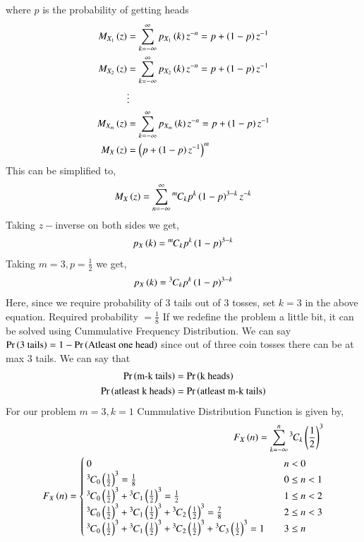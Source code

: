 \documentclass[journal]{IEEEtran}
\begin{document}
where $p$ is the probability of getting heads
\begin{align}
  M_{X_1}\left(z\right)&=\sum_{k=-\infty}^{\infty}p_{X_1}\left(k\right)z^{-n} = p + \left(1-p\right)z^{-1}\\
  M_{X_2}\left(z\right)&=\sum_{k=-\infty}^{\infty}p_{X_2}\left(k\right)z^{-n} = p + \left(1-p\right)z^{-1}\\
  &\vdots\\
  M_{X_m}\left(z\right)&=\sum_{k=-\infty}^{\infty}p_{X_m}\left(k\right)z^{-n} = p + \left(1-p\right)z^{-1}\\   M_X\left(z\right) &= \left(p + \left(1-p\right)z^{-1}\right)^{m}
\end{align}
This can be simplified to,
\begin{align}
  M_X\left(z\right) = \sum_{n=-\infty}^{\infty} {{}^{m}\mkern-1muC_{k}}p^{k}\left(1-p\right)^{3-k}z^{-k}
\end{align}
Taking $z-$inverse on both sides we get,
\begin{align}
  p_X\left(k\right) = {{}^{m}\mkern-1muC_{k}} p^{k} \left(1-p\right)^{3-k} 
\end{align}
Taking $m=3, p = \frac{1}{2}$ we get,
\begin{align}
  p_X\left(k\right) = {{}^{3}\mkern-1muC_{k}}p^k\left(1-p\right)^{3-k}
\end{align}
Here, since we require probability of $3$ tails out of $3$ tosses, set $k=3$ in the above equation.\newline
Required probability $=\frac{1}{8}$\newline
If we redefine the problem a little bit, it can be solved using Cummulative Frequency Distribution. We can say $\Pr\left(\text{3 tails}\right) = 1 - \Pr\left(\text{Atleast one head}\right)$ since out of three coin tosses there can be at max $3$ tails.\newline
We can say that 
\begin{align}
  \Pr\left(\text{m-k tails}\right) &= \Pr\left(\text{k heads}\right)\\
  \Pr\left(\text{atleast k heads}\right) &= \Pr\left(\text{atleast m-k tails}\right)
\end{align}
For our problem $m=3, k=1$
Cummulative Distribution Function is given by,
\begin{align}
    F_X \left(n\right) = \sum _{k=-\infty}^{n} {{}^{3}\mkern-1muC_{k}} \left(\frac{1}{2}\right)^3\\ 
    F_{X}\left(n\right) = \begin{cases}
        0 & \quad n < 0\\
        {{}^{3}\mkern-1muC_{0}}\left(\frac{1}{2}\right)^3 = \frac{1}{8} & \quad 0 \leq n < 1\\
        {{}^{3}\mkern-1muC_{0}}\left(\frac{1}{2}\right)^3 + {{}^{3}\mkern-1muC_{1}}\left(\frac{1}{2}\right)^3 = \frac{1}{2} & \quad 1 \leq n < 2\\
        {{}^{3}\mkern-1muC_{0}}\left(\frac{1}{2}\right)^3 + {{}^{3}\mkern-1muC_{1}}\left(\frac{1}{2}\right)^3 + {{}^{3}\mkern-1muC_{2}}\left(\frac{1}{2}\right)^3 = \frac{7}{8} & \quad 2 \leq n < 3\\
        {{}^{3}\mkern-1muC_{0}}\left(\frac{1}{2}\right)^3 + {{}^{3}\mkern-1muC_{1}}\left(\frac{1}{2}\right)^3 + {{}^{3}\mkern-1muC_{2}}\left(\frac{1}{2}\right)^3 + {{}^{3}\mkern-1muC_{3}}\left(\frac{1}{2}\right)^3 = 1 & \quad 3 \leq n
    \end{cases}
\end{align}
\end{document}
